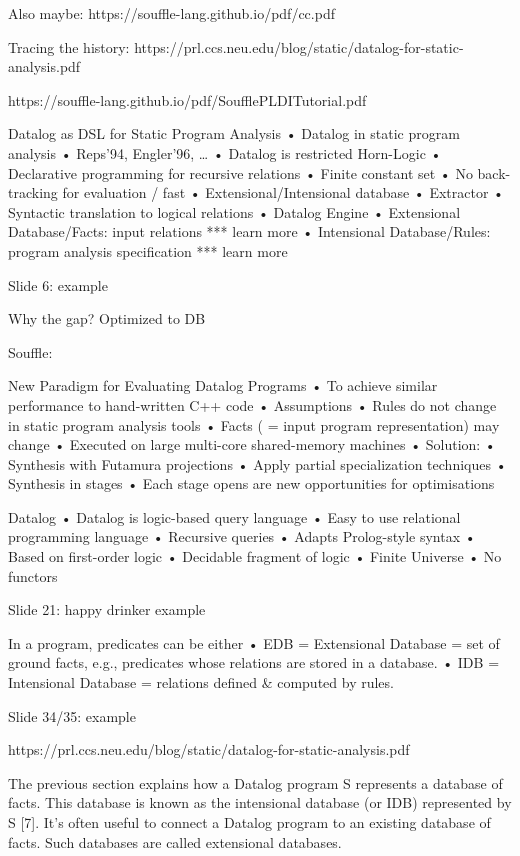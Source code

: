 \documentclass[11pt]{article}
\begin{document}
Also maybe: https://souffle-lang.github.io/pdf/cc.pdf

Tracing the history:
https://prl.ccs.neu.edu/blog/static/datalog-for-static-analysis.pdf


https://souffle-lang.github.io/pdf/SoufflePLDITutorial.pdf

Datalog as	DSL	for	Static	Program	Analysis
• Datalog in	static	program	analysis
• Reps’94,	Engler’96,	…
• Datalog is	restricted	Horn-Logic
• Declarative	programming	for	recursive	relations
• Finite	constant	set
• No	back-tracking	for	evaluation	/	fast
• Extensional/Intensional database
• Extractor
• Syntactic	translation	to	logical	relations
• Datalog Engine
• Extensional	Database/Facts:	input	relations *** learn more
• Intensional Database/Rules:	program	analysis	specification *** learn
more

Slide 6: example

Why the gap? Optimized to DB

Souffle:

New	Paradigm	for	Evaluating	Datalog Programs
• To	achieve	similar	performance	to	hand-written	C++	code
• Assumptions
• Rules	do	not	change	in	static	program	analysis	tools
• Facts	(	=	input	program	representation)	may	change
• Executed	on	large	multi-core	shared-memory	machines	
• Solution:	
• Synthesis	with	Futamura projections
• Apply	partial	specialization	techniques
• Synthesis	in	stages
• Each	stage	opens	are	new	opportunities	for	optimisations



Datalog
• Datalog is	logic-based query	language
• Easy	to	use	relational	programming	language
• Recursive queries
• Adapts	Prolog-style	syntax
• Based	on	first-order	logic
• Decidable	fragment	of	logic
• Finite	Universe
• No	functors

Slide 21: happy drinker example



In	a	program,	predicates	can	be	either
• EDB =	Extensional	Database =	set	of	ground	facts,	e.g.,	predicates	whose	
relations	are	stored	in	a	database.
• IDB =	Intensional Database =	relations	defined	&	computed
by	rules.

Slide 34/35: example


https://prl.ccs.neu.edu/blog/static/datalog-for-static-analysis.pdf

The previous section explains how a Datalog program S represents a database of
facts. This database is known as the intensional database (or IDB) represented
by S [7].
It’s often useful to connect a Datalog program to an existing database of
facts. Such databases are called extensional databases.
\end{document}
